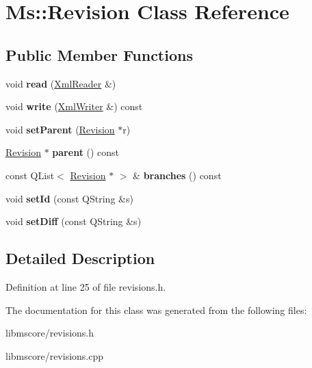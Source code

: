 \hypertarget{class_ms_1_1_revision}{}\section{Ms\+:\+:Revision Class Reference}
\label{class_ms_1_1_revision}
\subsection*{Public Member Functions}
\begin{DoxyCompactItemize}
\item 
\mbox{\label{class_ms_1_1_revision_a7e72e41e7d66864ee312e8d35cd14cef}} 
void {\bfseries read} (\hyperlink{class_ms_1_1_xml_reader}{Xml\+Reader} \&)
\item 
\mbox{\label{class_ms_1_1_revision_aba577fa2b692542b66305fabb1486271}} 
void {\bfseries write} (\hyperlink{class_ms_1_1_xml_writer}{Xml\+Writer} \&) const
\item 
\mbox{\label{class_ms_1_1_revision_a92de51b04d65657b89a7a2e473c01e6f}} 
void {\bfseries set\+Parent} (\hyperlink{class_ms_1_1_revision}{Revision} $\ast$r)
\item 
\mbox{\label{class_ms_1_1_revision_a324ae30ef1b03f9beaf54f0786d7876f}} 
\hyperlink{class_ms_1_1_revision}{Revision} $\ast$ {\bfseries parent} () const
\item 
\mbox{\label{class_ms_1_1_revision_a677ab176aa82956fbe123d0df09ffd18}} 
const Q\+List$<$ \hyperlink{class_ms_1_1_revision}{Revision} $\ast$ $>$ \& {\bfseries branches} () const
\item 
\mbox{\label{class_ms_1_1_revision_a3308101de8256a24b1ba82bff9418608}} 
void {\bfseries set\+Id} (const Q\+String \&s)
\item 
\mbox{\label{class_ms_1_1_revision_ad348307169466f3b09d6afcf26db0eb6}} 
void {\bfseries set\+Diff} (const Q\+String \&s)
\end{DoxyCompactItemize}


\subsection{Detailed Description}


Definition at line 25 of file revisions.\+h.



The documentation for this class was generated from the following files\+:\begin{DoxyCompactItemize}
\item 
libmscore/revisions.\+h\item 
libmscore/revisions.\+cpp\end{DoxyCompactItemize}
